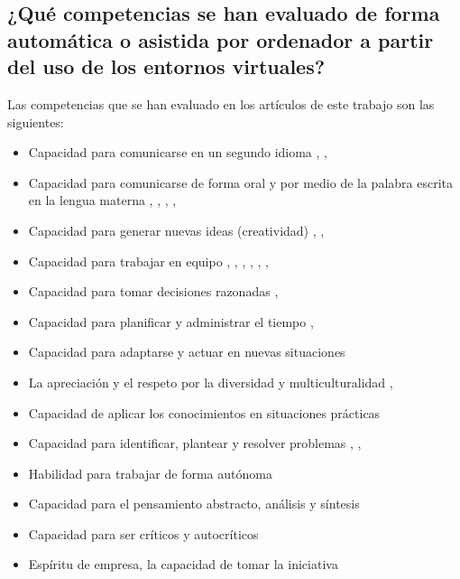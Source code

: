 \subsection{¿Qué competencias se han evaluado de forma automática o asistida por ordenador a partir del uso de los entornos virtuales?}
Las competencias que se han evaluado en los artículos de este trabajo son las siguientes:
\begin{itemize}
\item Capacidad para comunicarse en un segundo idioma \cite{Shih:2011}, \cite{MercedesRico:2013}, \cite{Masip-Alvarez:2013}
\item Capacidad para comunicarse de forma oral y por medio de la palabra escrita en la lengua materna \cite{Mohamed:2008}, \cite{Piedra:2010}, \cite{Liao:2013}, \cite{Masip-Alvarez:2013}, \cite{Colomo-Palacios:2013}
\item Capacidad para generar nuevas ideas (creatividad) \cite{Piedra:2010}, \cite{Liao:2013}, \cite{Colomo-Palacios:2013}
\item Capacidad para trabajar en equipo \cite{McMahon:2007}, \cite{Mohamed:2008}, \cite{Rashid:2008}, \cite{Lim:2011}, \cite{Liao:2013}, \cite{Masip-Alvarez:2013}, \cite{Colomo-Palacios:2013}
\item Capacidad para tomar decisiones razonadas \cite{Achcaoucaou:2012}, \cite{Colomo-Palacios:2013}
\item Capacidad para planificar y administrar el tiempo \cite{Achcaoucaou:2012}, \cite{Liao:2013}
\item Capacidad para adaptarse y actuar en nuevas situaciones \cite{Liao:2013}
\item La apreciación y el respeto por la diversidad y multiculturalidad \cite{Liao:2013}, \cite{Colomo-Palacios:2013}
\item Capacidad de aplicar los conocimientos en situaciones prácticas \cite{Liao:2013}
\item Capacidad para identificar, plantear y resolver problemas \cite{Achcaoucaou:2012}, \cite{Guenaga:2013}, \cite{Colomo-Palacios:2013}
\item Habilidad para trabajar de forma autónoma \cite{Colomo-Palacios:2013}
\item Capacidad para el pensamiento abstracto, análisis y síntesis \cite{Colomo-Palacios:2013}
\item Capacidad para ser críticos y autocríticos \cite{Colomo-Palacios:2013}
\item Espíritu de empresa, la capacidad de tomar la iniciativa \cite{Colomo-Palacios:2013}
\end{itemize}

